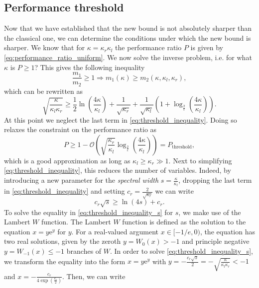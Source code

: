 \subsection{Performance threshold}\label{sec:performance_threshold}
Now that we have established that the new bound is not absolutely sharper than the classical one, we can determine the conditions under which the new bound is sharper. We know that for $\kappa=\kappa_r\kappa_l$ the performance ratio $P$ is given by \cref{eq:performance_ratio_uniform}. We now solve the inverse problem, i.e. for what $\kappa$ is $P \geq 1$? This gives the following inequality
\[
    \frac{m_1}{m_2} \geq 1 \Rightarrow m_1(\kappa) \geq m_2(\kappa, \kappa_l, \kappa_r),
\]
which can be rewritten as
\begin{equation}
    \sqrt{\frac{\kappa}{\kappa_l\kappa_r}} \geq \frac{1}{2}\ln\left(\frac{4\kappa}{\kappa_l}\right) + \frac{1}{\sqrt{\kappa_r}} + \frac{1}{\sqrt{\kappa_l}}\left(1 + \log_{\frac{2}{\epsilon}}\left(\frac{4\kappa}{\kappa_l}\right)\right).
    \label{eq:threshold_inequality}
\end{equation}
At this point we neglect the last term in \cref{eq:threshold_inequality}. Doing so relaxes the constraint on the performance ratio as
\begin{equation}
    P \geq 1 - \mathcal{O}\left(\sqrt{\frac{\kappa_r}{\kappa_l}}\log_{\frac{2}{\epsilon}}\left(\frac{4\kappa}{\kappa_l}\right)\right) = P_{\text{threshold}},
    \label{eq:approximate_performance_ratio_threshold}
\end{equation}
which is a good approximation as long as $\kappa_l \geq \kappa_r \gg 1$. Next to simplifying \cref{eq:threshold_inequality}, this reduces the number of variables. Indeed, by introducing a new parameter for the \textit{spectral width} $s = \frac{\kappa}{\kappa_l}$, dropping the last term in \cref{eq:threshold_inequality} and setting $c_r = \frac{2}{\sqrt{\kappa_r}}$ we can write
\begin{equation}
    c_r\sqrt{s} \geq \ln\left(4s\right) + c_r.
    \label{eq:threshold_inequality_s}
\end{equation}
To solve the equality in \cref{eq:threshold_inequality_s} for $s$, we make use of the Lambert $W$ function. The Lambert $W$ function is defined as the solution to the equation $x = y\mathrm{e}^y$ for $y$. For a real-valued argument $x \in [-1/e, 0)$, the equation has two real solutions, given by the zeroth $y = W_0(x) > -1$ and principle negative $y = W_{-1}(x) \leq -1$ branches of $W$. In order to solve \cref{eq:threshold_inequality_s}, we transform the equality into the form $x = y \mathrm{e}^y$ with $y = -\frac{c_r\sqrt{s}}{2} = -\sqrt{\frac{\kappa}{\kappa_l\kappa_r}} < -1$ and $x = -\frac{c_r}{4\exp\left(\frac{c_r}{2}\right)}$. Then, we can write
